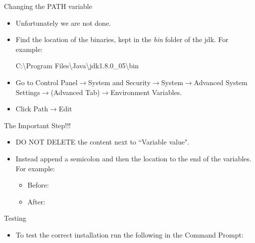 \begin{frame}{Changing the PATH variable}
\begin{itemize}
\item Unfortunately we are not done.
\item Find the location of the binaries, kept in the \emph{bin} folder of the jdk. For example:
    \begin{center}C:{\textbackslash}Program Files{\textbackslash}Java{\textbackslash}jdk1.8.0\_05{\textbackslash}bin
    \end{center}

\item Go to Control Panel$\rightarrow$System and Security$\rightarrow$System$\rightarrow$Advanced System Settings$\rightarrow$(Advanced Tab)$\rightarrow$Environment Variables.
\item Click Path$\rightarrow$Edit
\end{itemize}
\end{frame}


\begin{frame}{The Important Step!!!}
\begin{itemize}
\item DO NOT DELETE the content next to ``Variable value".
\item Instead append a semicolon and then the location to the end of the variables. For example:

    \begin{itemize}
    \item Before: 
    \item After: 
    \end{itemize}
\end{itemize}
\end{frame}

\begin{frame}[fragile]{Testing}
\begin{itemize}
\item To test the correct installation run the following in the Command Prompt:
\begin{semiverbatim}\end{semiverbatim}

\end{itemize}

\end{frame}

